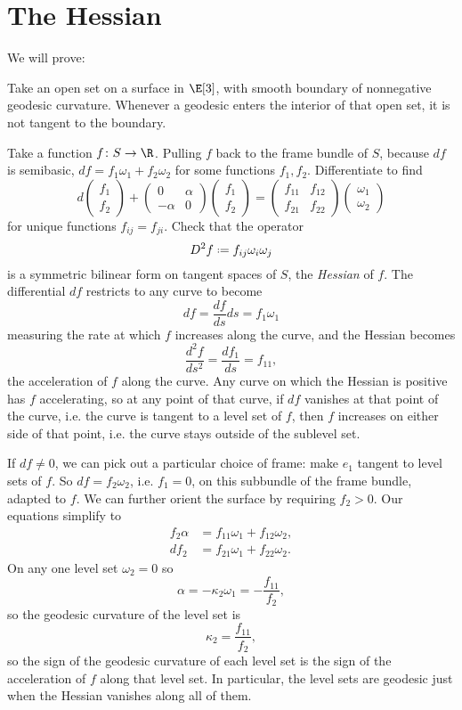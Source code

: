 \section{The Hessian}
We will prove:
\begin{theorem}\label{theorem:hessian}
Take an open set on a surface in \(\E[3]\), with smooth boundary of nonnegative geodesic curvature.
Whenever a geodesic enters the interior of that open set, it is not tangent to the boundary.
\end{theorem}
Take a function \(f\colon S \to\R\).
Pulling \(f\) back to the frame bundle of \(S\), because \(df\) is semibasic, \(df=f_1\omega_1+f_2\omega_2\) for some functions \(f_1,f_2\).
Differentiate to find
\[
d
\begin{pmatrix}
f_1\\
f_2
\end{pmatrix}
+
\begin{pmatrix}
0 & \alpha\\
-\alpha & 0
\end{pmatrix}
\begin{pmatrix}
f_1\\
f_2
\end{pmatrix}
=
\begin{pmatrix}
f_{11} & f_{12} \\
f_{21} & f_{22}
\end{pmatrix}
\begin{pmatrix}
\omega_1\\
\omega_2
\end{pmatrix}
\]
for unique functions \(f_{ij}=f_{ji}\).
Check that the operator
\[
D^2f\defeq f_{ij}\omega_i\omega_j
\]
is a symmetric bilinear form on tangent spaces of \(S\), the \emph{Hessian} of \(f\).
The differential \(df\) restricts to any curve to become 
\[
df=\frac{df}{ds}ds=f_1 \omega_1
\]
measuring the rate at which \(f\) increases along the curve, and the Hessian becomes
\[
\frac{d^2f}{ds^2}=\frac{df_1}{ds}=f_{11},
\]
the acceleration of \(f\) along the curve.
Any curve on which the Hessian is positive has \(f\) accelerating, so at any point of that curve, if \(df\) vanishes at that point of the curve, i.e. the curve is tangent to a level set of \(f\), then \(f\) increases on either side of that point, i.e. the curve stays outside of the sublevel set.

If \(df\ne 0\), we can pick out a particular choice of frame: make \(e_1\) tangent to level sets of \(f\).
So \(df=f_2\omega_2\), i.e. \(f_1=0\), on this subbundle of the frame bundle, adapted to \(f\).
We can further orient the surface by requiring \(f_2>0\).
Our equations simplify to
\begin{align*}
f_2\alpha&=f_{11}\omega_1+f_{12}\omega_2,\\
df_2&=f_{21}\omega_1+f_{22}\omega_2.
\end{align*}
On any one level set \(\omega_2=0\) so
\[
\alpha=-\kappa_2\omega_1=-\frac{f_{11}}{f_2},
\]
so the geodesic curvature of the level set is
\[
\kappa_2=\frac{f_{11}}{f_2},
\]
so the sign of the geodesic curvature of each level set is the sign of the acceleration of \(f\) along that level set.
In particular, the level sets are geodesic just when the Hessian vanishes along all of them.

